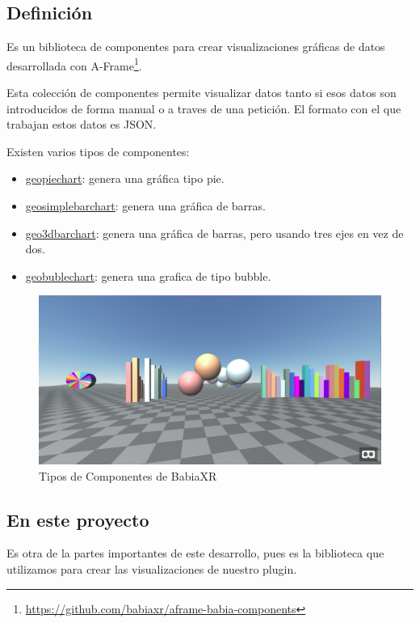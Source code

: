 \documentclass[a4paper, 12pt]{book}
\begin{document}
\subsection{Definición}

Es un biblioteca de componentes para crear visualizaciones gráficas de datos desarrollada con A-Frame\footnote{\url{https://github.com/babiaxr/aframe-babia-components}}. 

Esta colección de componentes permite visualizar datos tanto si esos datos son introducidos de forma manual o a traves de una petición. El formato con el que trabajan estos datos es JSON.

Existen varios tipos de componentes:
\begin{itemize}
    \item \underline{geopiechart}: genera una gráfica tipo pie.
    \item \underline{geosimplebarchart}: genera una gráfica de barras.
    \item \underline{geo3dbarchart}: genera una gráfica de barras, pero usando tres ejes en vez de dos.
    \item \underline{geobublechart}: genera una grafica de tipo bubble.
\end{itemize}

\begin{figure}[H]
  \centering
  \includegraphics[width=12cm, keepaspectratio]{img/development/babiaxrcomponents.png}
  \caption{Tipos de Componentes de BabiaXR}
  \label{fig:babiacomponents}
\end{figure}

\subsection{En este proyecto}

Es otra de la partes importantes de este desarrollo, pues es la biblioteca que utilizamos para crear las visualizaciones de nuestro plugin.
\end{document}

